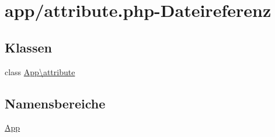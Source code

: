 \hypertarget{attribute_8php}{}\section{app/attribute.php-\/\+Dateireferenz}
\label{attribute_8php}
\subsection*{Klassen}
\begin{DoxyCompactItemize}
\item 
class \hyperlink{classApp_1_1attribute}{App\textbackslash{}attribute}
\end{DoxyCompactItemize}
\subsection*{Namensbereiche}
\begin{DoxyCompactItemize}
\item 
 \hyperlink{namespaceApp}{App}
\end{DoxyCompactItemize}

